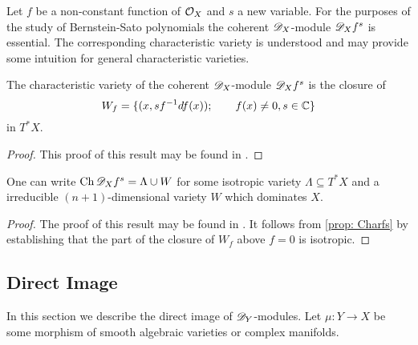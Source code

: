 Let $f$ be a non-constant function of $\mathcal{O}_X$ and $s$ a new variable.
For the purposes of the study of Bernstein-Sato polynomials the coherent $\mathscr{D}_X$-module $\mathscr{D}_X f^s$ is essential.
The corresponding characteristic variety is understood and may provide some intuition for general characteristic varieties.
\begin{proposition}\label{prop: Charfs}
  The characteristic variety of the coherent $\mathscr{D}_X$-module $\mathscr{D}_Xf^s$ is the closure of
  $$W_f = \{(x,sf^{-1}df(x)); \qquad f(x)\neq 0, s\in \mathbb{C} \}$$
  in $T^*X$.
\end{proposition}
\begin{proof}
  This proof of this result may be found in \cite{kashiwara1976b}.
\end{proof}
\begin{proposition}\label{prop: IsotropicAndDominate}
  One can write $\operatorname{Ch} \mathscr{D}_X f^s = \Lambda \cup W$ for some isotropic variety $\Lambda \subseteq T^*X$ and a irreducible $(n+1)$-dimensional variety $W$ which dominates $X$.
\end{proposition}
\begin{proof}
  The proof of this result may be found in \cite{kashiwara1976b}. It follows from \cref{prop: Charfs} by establishing that the part of the closure of $W_f$ above $f=0$ is isotropic.
\end{proof}

\subsection{Direct Image}
In this section we describe the direct image of $\mathscr{D}_Y$-modules.
Let $\mu:Y\to X$ be some morphism of smooth algebraic varieties or complex manifolds.

